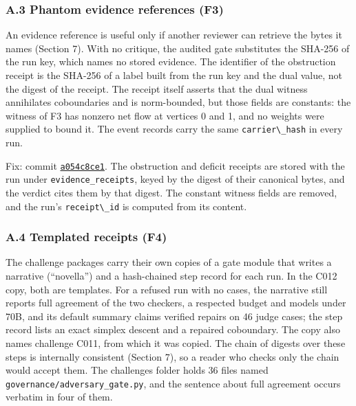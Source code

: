 \documentclass[
  11pt,
]{article}
\newcommand{\passthrough}[1]{#1}
\begin{document}
\subsubsection{A.3 Phantom evidence references
(F3)}\label{a.3-phantom-evidence-references-f3}

An evidence reference is useful only if another reviewer can retrieve
the bytes it names (Section 7). With no critique, the audited gate
substitutes the SHA-256 of the run key, which names no stored evidence.
The identifier of the obstruction receipt is the SHA-256 of a label
built from the run key and the dual value, not the digest of the
receipt. The receipt itself asserts that the dual witness annihilates
coboundaries and is norm-bounded, but those fields are constants: the
witness of F3 has nonzero net flow at vertices 0 and 1, and no weights
were supplied to bound it. The event records carry the same
\passthrough{\lstinline!carrier\_hash!} in every run.

Fix: commit
\href{https://github.com/dbccpage/the_symbol_game/commit/a054c8ce17c3025ac5518aaeef29096a299519bb}{\passthrough{\lstinline!a054c8ce1!}}.
The obstruction and deficit receipts are stored with the run under
\nolinkurl{evidence_receipts}, keyed by the digest of their canonical
bytes, and the verdict cites them by that digest. The constant witness
fields are removed, and the run's \passthrough{\lstinline!receipt\_id!}
is computed from its content.

\subsubsection{A.4 Templated receipts
(F4)}\label{a.4-templated-receipts-f4}

The challenge packages carry their own copies of a gate module that
writes a narrative (``novella'') and a hash-chained step record for each
run. In the C012 copy, both are templates. For a refused run with no
cases, the narrative still reports full agreement of the two checkers, a
respected budget and models under 70B, and its default summary claims
verified repairs on 46 judge cases; the step record lists an exact
simplex descent and a repaired coboundary. The copy also names challenge
C011, from which it was copied. The chain of digests over these steps is
internally consistent (Section 7), so a reader who checks only the chain
would accept them. The challenges folder holds 36 files named
\nolinkurl{governance/adversary_gate.py}, and the sentence about full
agreement occurs verbatim in four of them.
\end{document}
